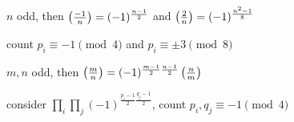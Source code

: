 \begin{lemma}
    $n$ odd, then $\left( \frac{-1}{n} \right) = (-1)^\frac{n-1}{2}$ and $\left( \frac{2}{n} \right) = (-1)^{\frac{n^2 - 1}{8}}$
\end{lemma}
\begin{pf}
    count $p_i \equiv -1 \pmod{4}$ and $p_i \equiv \pm 3 \pmod 8$
\end{pf}

\begin{thm}
    $m, n$ odd, then $\left( \frac{m}{n} \right) = (-1)^{\frac{m-1}{2}\frac{n-1}{2}}\left( \frac{n}{m} \right)$
\end{thm}
\begin{pf}
    consider $\prod_i \prod_j (-1)^{\frac{p_i - 1}{2}\frac{q_j - 1}{2}}$, count $p_i, q_j \equiv -1 \pmod{4}$
\end{pf}


